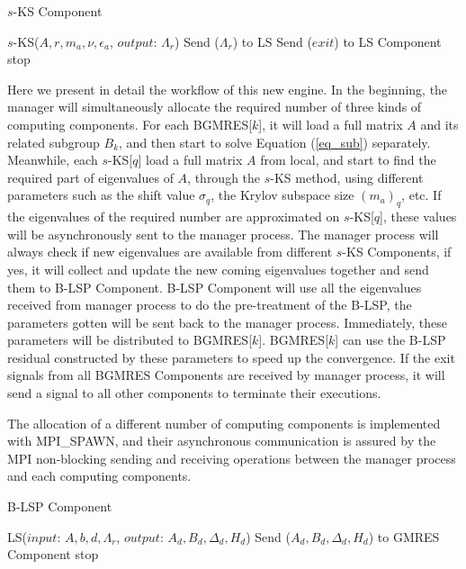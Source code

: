 \begin{algorithm}[h]
	\label{skspc}
	\begin{algorithmic}[1]
		\caption{$s$-KS Component}   
		\State $s$-KS($A, r, m_a, \nu,\epsilon_a$, $output$: $\Lambda_r$)
		\State Send ($\Lambda_r$) to LS
		\State Send ($exit$) to LS Component  \State stop \EndIf
		\EndWhile
		\EndFunction
	\end{algorithmic}  
\end{algorithm}

Here we present in detail the workflow of this new engine. In the beginning, the manager will simultaneously allocate the required number of three kinds of computing components. For each BGMRES[$k$], it will load a full matrix $A$ and its related subgroup $B_k$, and then start to solve Equation (\ref{eq_sub}) separately. Meanwhile, each $s$-KS[$q$] load a full matrix $A$ from local, and start to find the required part of eigenvalues of $A$, through the $s$-KS method, using different parameters such as the shift value $\sigma_q$, the Krylov subspace size $(m_a)_q$, etc. If the eigenvalues of the required number are approximated on $s$-KS[$q$], these values will be asynchronously sent to the manager process. The manager process will always check if new eigenvalues are available from different $s$-KS Components, if yes, it will collect and update the new coming eigenvalues together and send them to B-LSP Component. B-LSP Component will use all the eigenvalues received from manager process to do the pre-treatment of the B-LSP, the parameters gotten will be sent back to the manager process. Immediately, these parameters will be distributed to BGMRES[$k$]. BGMRES[$k$] can use the B-LSP residual constructed by these parameters to speed up the convergence. If the exit signals from all BGMRES Components are received by manager process, it will send a signal to all other components to terminate their executions.

The allocation of a different number of computing components is implemented with MPI\_SPAWN, and their asynchronous communication is assured by the MPI non-blocking sending and receiving operations between the manager process and each computing components.

\begin{algorithm}[h]
	\label{blspc}
	\caption{B-LSP Component}   
	\begin{algorithmic}[1]
		\State LS{($input$: $A,b,d,\Lambda_r$, $output$: $A_d, B_d, \Delta_d, H_d$)}
		\State Send ($A_d, B_d, \Delta_d, H_d$) to GMRES Component
		\EndIf
		\State stop \EndIf
		\EndFunction
		
	\end{algorithmic}  
\end{algorithm}

